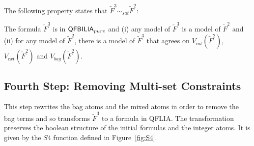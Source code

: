 The following property states that $\tilde{F}^3 \sim_{sat} \tilde{F}^2$:
\begin{myprop}
\label{prop:countabs}
The formula $\tilde{F}^3$ is in $\textsf{QFBILIA}_{pure}$ and
(i) any model of $\tilde{F}^3$ is a model of $\tilde{F}^2$ and
(ii) for any model of $\tilde{F}^2$, there is a model of $\tilde{F}^3$ that agrees on $V_{int}(\tilde{F}^2)$, $V_{ext}(\tilde{F}^2)$ and $V_{bag}(\tilde{F}^2)$.
\end{myprop}

\subsection{Fourth Step: Removing Multi-set Constraints}
\label{subsec:rewritting qflia}
This step rewrites the bag atoms and the mixed atoms in order to remove the bag terms and so transforms $\tilde{F}^3$ to a formula in QFLIA.
The transformation preserves the boolean structure of the initial formulas and the integer atoms.
It is given by the $S4$ function defined in Figure~\ref{fig:S4}.

